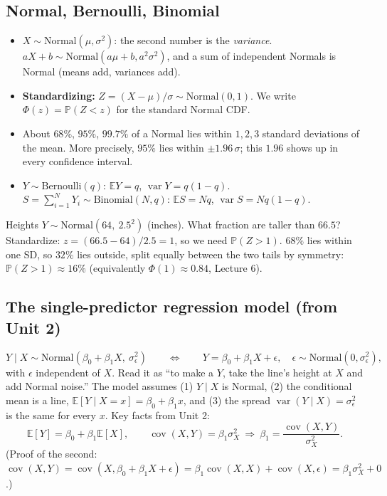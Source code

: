 \documentclass[11pt]{article}
\newcommand{\E}{\mathbb{E}}
\newcommand{\Var}{\operatorname{var}}
\newcommand{\Cov}{\operatorname{cov}}
\renewcommand{\P}{\mathbb{P}}
\newcommand{\given}{\mid}
\newcommand{\Bern}{\text{Bernoulli}}
\newcommand{\Bin}{\text{Binomial}}
\newcommand{\Norm}{\text{Normal}}
\begin{document}
\subsection{Normal, Bernoulli, Binomial}
\begin{itemize}[leftmargin=*,itemsep=2pt]
\item $X\sim\Norm(\mu,\sigma^2)$: the second number is the \emph{variance}. $aX+b\sim\Norm(a\mu+b,a^2\sigma^2)$, and a sum of
independent Normals is Normal (means add, variances add).
\item \textbf{Standardizing:} $Z=(X-\mu)/\sigma\sim\Norm(0,1)$. We write $\Phi(z)=\P(Z<z)$ for the standard Normal CDF.
\item About $68\%$, $95\%$, $99.7\%$ of a Normal lies within $1,2,3$ standard deviations of the mean. More precisely, $95\%$ lies
within $\pm1.96\,\sigma$; this $1.96$ shows up in every confidence interval.
\item $Y\sim\Bern(q)$: $\E Y=q$, $\Var Y=q(1-q)$. $S=\sum_{i=1}^NY_i\sim\Bin(N,q)$: $\E S=Nq$, $\Var S=Nq(1-q)$.
\end{itemize}

\begin{examplebox}[title={Example: using the 68\% rule}]
Heights $Y\sim\Norm(64,\ 2.5^2)$ (inches). What fraction are taller than $66.5$? Standardize: $z=(66.5-64)/2.5=1$, so we need
$\P(Z>1)$. $68\%$ lies within one SD, so $32\%$ lies outside, split equally between the two tails by symmetry: $\P(Z>1)\approx16\%$
(equivalently $\Phi(1)\approx0.84$, Lecture 6).
\end{examplebox}

\subsection{The single-predictor regression model (from Unit 2)}\label{sec:regmodel}
\[
Y\given X\sim\Norm(\beta_0+\beta_1X,\ \sigma_\epsilon^2)\qquad\Longleftrightarrow\qquad Y=\beta_0+\beta_1X+\epsilon,\quad \epsilon\sim\Norm(0,\sigma_\epsilon^2),
\]
with $\epsilon$ independent of $X$. Read it as ``to make a $Y$, take the line's height at $X$ and add Normal noise.'' The model assumes
(1) $Y\given X$ is Normal, (2) the conditional mean is a line, $\E[Y\given X=x]=\beta_0+\beta_1x$, and (3) the spread $\Var(Y\given X)=\sigma_\epsilon^2$
is the same for every $x$. Key facts from Unit 2:
\[
\E[Y]=\beta_0+\beta_1\E[X],\qquad \Cov(X,Y)=\beta_1\sigma_X^2\ \Longrightarrow\ \beta_1=\frac{\Cov(X,Y)}{\sigma_X^2}.
\]
(Proof of the second: $\Cov(X,Y)=\Cov(X,\beta_0+\beta_1X+\epsilon)=\beta_1\Cov(X,X)+\Cov(X,\epsilon)=\beta_1\sigma_X^2+0$.)
\end{document}
